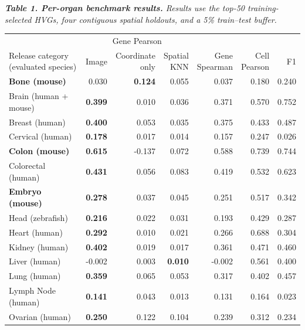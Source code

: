\documentclass[10pt]{article}
\begin{document}
\begin{center}
\begingroup
\footnotesize
\setlength{\tabcolsep}{4.2pt}
\renewcommand{\arraystretch}{1.04}
\textit{\textbf{Table 1. Per-organ benchmark results.}
Results use the top-50 training-selected HVGs, four contiguous spatial
holdouts, and a 5\% train--test buffer.}\\[5pt]
\begin{tabular*}{\linewidth}{@{\extracolsep{\fill}}lrrrrrr@{}}
\toprule
& \multicolumn{3}{c}{Gene Pearson} & & & \\
\cmidrule(lr){2-4}
\shortstack[l]{Release category\\(evaluated species)} &
Image &
\shortstack{Coordinate\\only} &
\shortstack{Spatial\\KNN} &
\shortstack{Gene\\Spearman} &
\shortstack{Cell\\Pearson} &
F1 \\
\midrule
\textbf{Bone (mouse)} & 0.030 & \textbf{0.124} & 0.055 & 0.037 & 0.180 & 0.240 \\
Brain (human + mouse) & \textbf{0.399} & 0.010 & 0.036 & 0.371 & 0.570 & 0.752 \\
Breast (human) & \textbf{0.400} & 0.053 & 0.035 & 0.375 & 0.433 & 0.487 \\
Cervical (human) & \textbf{0.178} & 0.017 & 0.014 & 0.157 & 0.247 & 0.026 \\
\textbf{Colon (mouse)} & \textbf{0.615} & -0.137 & 0.072 & 0.588 & 0.739 & 0.744 \\
Colorectal (human) & \textbf{0.431} & 0.056 & 0.083 & 0.419 & 0.532 & 0.623 \\
\textbf{Embryo (mouse)} & \textbf{0.278} & 0.037 & 0.045 & 0.251 & 0.517 & 0.342 \\
Head (zebrafish) & \textbf{0.216} & 0.022 & 0.031 & 0.193 & 0.429 & 0.287 \\
Heart (human) & \textbf{0.292} & 0.010 & 0.021 & 0.266 & 0.688 & 0.304 \\
Kidney (human) & \textbf{0.402} & 0.019 & 0.017 & 0.361 & 0.471 & 0.460 \\
Liver (human) & -0.002 & 0.003 & \textbf{0.010} & -0.002 & 0.561 & 0.400 \\
Lung (human) & \textbf{0.359} & 0.065 & 0.053 & 0.317 & 0.402 & 0.457 \\
Lymph Node (human) & \textbf{0.141} & 0.043 & 0.013 & 0.131 & 0.164 & 0.023 \\
Ovarian (human) & \textbf{0.250} & 0.122 & 0.104 & 0.239 & 0.312 & 0.234 \\

\end{tabular*}
\end{center}
\end{document}
